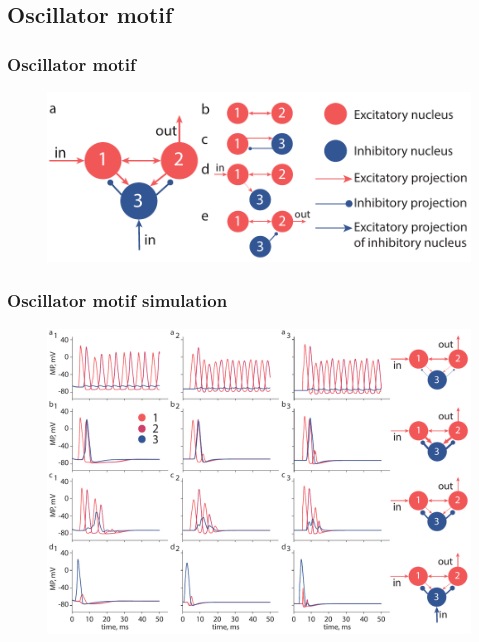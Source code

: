 \documentclass[12pt, aspectratio=169]{beamer}
\begin{document}
\subsection{Oscillator motif}
\begin{frame}
  \frametitle{Oscillator motif}
  \begin{figure}
    \includegraphics[width=0.8\linewidth]{OM}
  \end{figure}
\end{frame}
\begin{frame}
  \frametitle{Oscillator motif simulation}
  \begin{figure}
    \includegraphics[width=0.7\linewidth]{OM_sim}
  \end{figure}
\end{frame}
\end{document}
